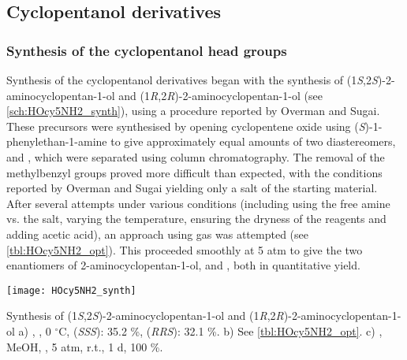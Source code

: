 \subsection{Cyclopentanol derivatives}

\subsubsection{Synthesis of the cyclopentanol head groups}

Synthesis of the cyclopentanol derivatives began with the synthesis of (1\textit{S},2\textit{S})-2-aminocyclopentan-1-ol  and (1\textit{R},2\textit{R})-2-aminocyclopentan-1-ol  (see \ref{sch:HOcy5NH2_synth}), using a procedure reported by Overman and Sugai\cite{Aube1992,Overman1985,Overman1985a}.
These precursors were synthesised by opening cyclopentene oxide  using (\textit{S})-1-phenylethan-1-amine  to give approximately equal amounts of two diastereomers,  and , which were separated using column chromatography. 
The removal of the methylbenzyl groups proved more difficult than expected, with the conditions reported by Overman and Sugai\cite{Overman1985} yielding only a salt of the starting material.
After several attempts under various conditions (including using the free amine vs. the salt, varying the temperature, ensuring the dryness of the reagents and adding acetic acid), an approach using  gas was attempted (see \ref{tbl:HOcy5NH2_opt}). This proceeded smoothly at 5 atm to give the two enantiomers of 2-aminocyclopentan-1-ol,  and , both in quantitative yield.

\begin{scheme}[H]
	\begin{center}
		\texttt{[image: HOcy5NH2\_synth]}
		\caption{Synthesis of (1\textit{S},2\textit{S})-2-aminocyclopentan-1-ol  and (1\textit{R},2\textit{R})-2-aminocyclopentan-1-ol 
		a) , , 0 $^\circ$C,  
		 (\textit{SSS}): 35.2 \%,
		 (\textit{RRS}): 32.1 \%.
		b) See \ref{tbl:HOcy5NH2_opt}.
		c) , MeOH, , 5 atm, r.t., 1 d, 100 \%.
		\label{sch:HOcy5NH2_synth}}
	\end{center}
\end{scheme}


